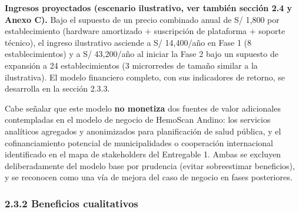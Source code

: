 \documentclass[11pt,a4paper]{article}
\begin{document}
\textbf{Ingresos proyectados (escenario ilustrativo, ver también sección 2.4 y Anexo C).} Bajo el supuesto de un precio combinado anual de S/ 1,800 por establecimiento (hardware amortizado + suscripción de plataforma + soporte técnico), el ingreso ilustrativo asciende a S/ 14,400/año en Fase 1 (8 establecimientos) y a S/ 43,200/año al iniciar la Fase 2 bajo un supuesto de expansión a 24 establecimientos (3 microrredes de tamaño similar a la ilustrativa). El modelo financiero completo, con sus indicadores de retorno, se desarrolla en la sección 2.3.3.

Cabe señalar que este modelo \textbf{no monetiza} dos fuentes de valor adicionales contempladas en el modelo de negocio de HemoScan Andino: los servicios analíticos agregados y anonimizados para planificación de salud pública, y el cofinanciamiento potencial de municipalidades o cooperación internacional identificado en el mapa de stakeholders del Entregable 1. Ambas se excluyen deliberadamente del modelo base por prudencia (evitar sobreestimar beneficios), y se reconocen como una vía de mejora del caso de negocio en fases posteriores.

\subsubsection{2.3.2 Beneficios cualitativos}\label{beneficios-cualitativos}
\end{document}

